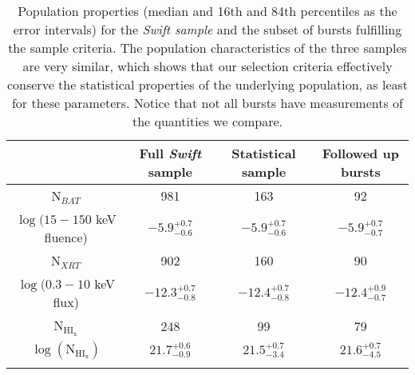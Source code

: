 \begin{table*}[!ht]
	\centering
	\begin{tabular}{cccc}
		\hline
		\hline\noalign{\smallskip}
		{} & {Full \textit{Swift} sample} & {Statistical sample} &  {Followed up bursts} \\
		\hline\noalign{\smallskip}
		N$_{BAT}$ & 981 & 163 & 92\\
		$\log(15-150$ keV fluence)  & $-5.9_{-0.6}^{+0.7}$ &  $-5.9_{-0.6}^{+0.7}$ &  $-5.9_{-0.7}^{+0.7}$   \\
		N$_{XRT}$ & 902 & 160 & 90\\
		$\log(0.3-10$ keV flux) & $-12.3_{-0.8}^{+0.7}$ &  $-12.4_{-0.8}^{+0.7}$ &  $-12.4_{-0.7}^{+0.9}$  \\
		N$_{\mathrm{HI_x}}$ & 248 & 99 & 79\\
		$\log(\mathrm{N}_{\mathrm{HI_x}})$ & $21.7_{-0.9}^{+0.6}$ &  $21.5_{-3.4}^{+0.7}$ &  $21.6_{-4.5}^{+0.7}$  \\
		\hline\noalign{\smallskip}

\end{tabular} 

\caption{
	Population properties (median and 16th and 84th percentiles as the
	error intervals) for the \textit{Swift sample} and the subset of bursts
	fulfilling the sample criteria. The population characteristics of the three
	samples are very similar, which shows that our selection criteria effectively
	conserve the statistical properties of the underlying population, as least for
	these parameters.  Notice that not all bursts have measurements of the
	quantities we compare. \label{tab:sample_properties}
	}

\end{table*}